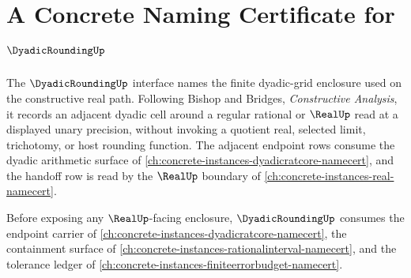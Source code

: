 \chapter{A Concrete Naming Certificate for $\DyadicRoundingUp$}
\label{ch:concrete-instances-dyadicrounding-namecert}

The $\DyadicRoundingUp$ interface names the finite dyadic-grid enclosure used on the constructive real path. Following Bishop and Bridges, \emph{Constructive Analysis}, it records an adjacent dyadic cell around a regular rational or $\RealUp$ read at a displayed unary precision, without invoking a quotient real, selected limit, trichotomy, or host rounding function. The adjacent endpoint rows consume the dyadic arithmetic surface of \autoref{ch:concrete-instances-dyadicratcore-namecert}, and the handoff row is read by the $\RealUp$ boundary of \autoref{ch:concrete-instances-real-namecert}.

Before exposing any $\RealUp$-facing enclosure, $\DyadicRoundingUp$ consumes the endpoint carrier of \autoref{ch:concrete-instances-dyadicratcore-namecert}, the containment surface of \autoref{ch:concrete-instances-rationalinterval-namecert}, and the tolerance ledger of \autoref{ch:concrete-instances-finiteerrorbudget-namecert}.

